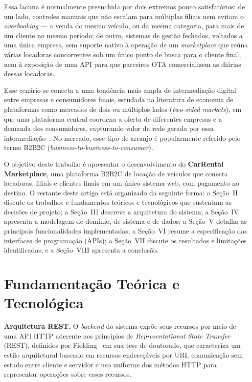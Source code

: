 \documentclass[conference,a4paper]{IEEEtran}
\begin{document}
Essa lacuna é normalmente preenchida por dois extremos pouco satisfatórios: de um lado, controles manuais que não escalam para múltiplas filiais nem evitam o \textit{overbooking} --- a venda do mesmo veículo, ou da mesma categoria, para mais de um cliente no mesmo período; de outro, sistemas de gestão fechados, voltados a uma única empresa, sem suporte nativo à operação de um \textit{marketplace} que reúna várias locadoras concorrentes sob um único ponto de busca para o cliente final, nem à exposição de uma API para que parceiros OTA comercializem as diárias dessas locadoras.

Esse cenário se conecta a uma tendência mais ampla de intermediação digital entre empresas e consumidores finais, estudada na literatura de economia de plataformas como mercados de dois ou múltiplos lados (\textit{two-sided markets}), em que uma plataforma central coordena a oferta de diferentes empresas e a demanda dos consumidores, capturando valor da rede gerada por essa intermediação~\cite{rochet2003}. No mercado, esse tipo de arranjo é popularmente referido pelo termo B2B2C (\textit{business-to-business-to-consumer}).

O objetivo deste trabalho é apresentar o desenvolvimento do \textbf{CarRental Marketplace}, uma plataforma B2B2C de locação de veículos que conecta locadoras, filiais e clientes finais em um único sistema web, com pagamento no destino. O restante deste artigo está organizado da seguinte forma: a Seção~II discute os trabalhos e fundamentos teóricos e tecnológicos que sustentam as decisões de projeto; a Seção~III descreve a arquitetura do sistema; a Seção~IV apresenta a modelagem de domínio, de sistema e de dados; a Seção~V detalha as principais funcionalidades implementadas; a Seção~VI resume a especificação das interfaces de programação (APIs); a Seção~VII discute os resultados e limitações identificadas; e a Seção~VIII apresenta a conclusão.

\section{Fundamentação Teórica e Tecnológica}

\textbf{Arquitetura REST.} O \textit{backend} do sistema expõe seus recursos por meio de uma API HTTP aderente aos princípios de \textit{Representational State Transfer} (REST), definidos por Fielding~\cite{fielding2000} em sua tese de doutorado, que caracteriza um estilo arquitetural baseado em recursos endereçáveis por URI, comunicação sem estado entre cliente e servidor e uso uniforme dos métodos HTTP para representar operações sobre esses recursos.
\end{document}
